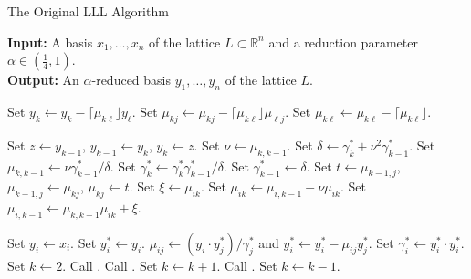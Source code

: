 \documentclass[11pt,letterpaper]{article}
\newcommand{\reals}{\mathbb{R}}
\theoremstyle{definition}
\begin{document}
\begin{algorithm}
\caption{The Original LLL Algorithm}
\textbf{Input: }A basis $x_1, \ldots, x_n$ of the lattice $L\subset \reals^n$ and a reduction parameter $\alpha\in (\frac{1}{4}, 1)$.\\
\textbf{Output: }An $\alpha$-reduced basis $y_1, \ldots, y_n$ of the lattice $L$.
\begin{algorithmic}[1]
			\State Set $y_k \gets y_k - \lceil \mu_{k\ell}\rfloor y_\ell$.
				\State Set $\mu_{kj}\gets \mu_{kj}-\lceil\mu_{k\ell}\rfloor\mu_{\ell j}$.
			\EndFor
			\State Set $\mu_{k\ell}\gets \mu_{k\ell}-\lceil \mu_{k\ell}\rfloor$.
		\EndIf
	\EndProcedure

		\State Set $z\gets y_{k-1}$, $y_{k-1}\gets y_k$, $y_k\gets z$.%
		\State Set $\nu\gets \mu_{k, k-1}$. Set $\delta \gets \gamma_k^* + \nu^2\gamma_{k-1}^*$.
		\State Set $\mu_{k, k-1}\gets \nu\gamma_{k-1}^*/\delta$. Set $\gamma_k^*\gets \gamma_k^*\gamma_{k-1}^*/\delta$. Set $\gamma_{k-1}^*\gets \delta$.
			\State Set $t\gets \mu_{k-1, j}$, $\mu_{k-1, j}\gets \mu_{kj}$, $\mu_{kj}\gets t$.%
		\EndFor
			\State Set $\xi \gets \mu_{ik}$. Set $\mu_{ik}\gets \mu_{i,k-1}-\nu\mu_{ik}$.
			\State Set $\mu_{i,k-1}\gets \mu_{k, k-1}\mu_{ik}+\xi$.
		\EndFor
	\EndProcedure

			\State Set $y_i\gets x_i$.
		\EndFor
			\State Set $y_i^*\gets y_i$.
				\State $\mu_{ij}\gets (y_i\cdot y_j^*)/\gamma_j^*$ and $y_i^*\gets y_i^*-\mu_{ij}y_j^*$.
			\EndFor
			\State Set $\gamma_i^*\gets y_i^*\cdot y_i^*$.
		\EndFor
		\State Set $k\gets 2$.
			\State Call .
					\State Call .
				\EndFor
				\State Set $k\gets k+1$.
			\Else
				\State Call .
					\State Set $k\gets k-1$.
				\EndIf
			\EndIf
		\EndWhile
	\EndProcedure
\end{algorithmic}
\end{algorithm}
\end{document}
